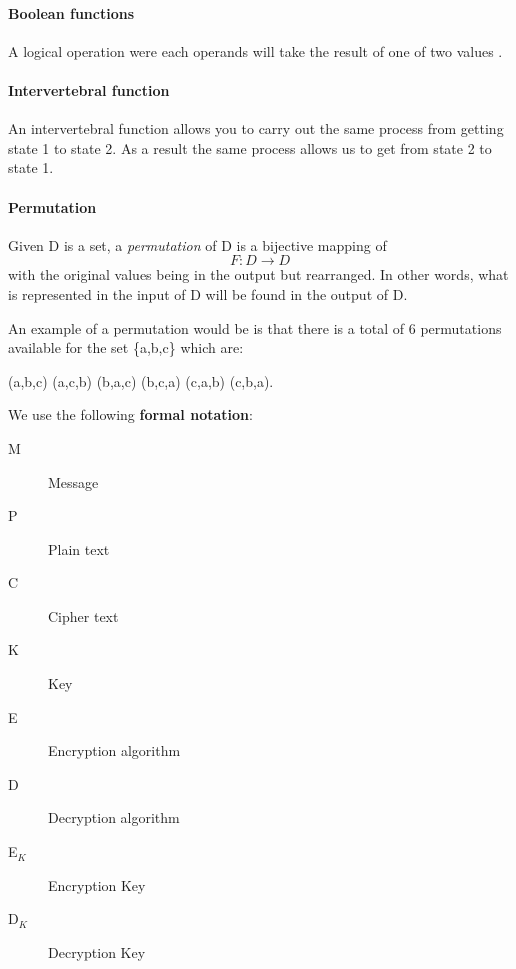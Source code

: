 \documentclass[11pt,a4paper]{report}
\begin{document}
\paragraph{Boolean functions}
A logical operation were each operands will take the result of one of two values \cite{Gregory2013Cryptanalysis}.

\paragraph{Intervertebral function}
An intervertebral function allows you to carry out the
same process from getting state 1 to state 2. As a result the same process
allows us to get from state 2 to state 1.

\paragraph{Permutation}
Given D is a set, a \emph{permutation} of D is a bijective mapping of
\begin{displaymath}
F: D \rightarrow D
\end{displaymath}
with the original values being in the output but rearranged. In other words, what is represented in the input of D will be found in the output of D.

An example of a permutation would be is that there is a total of 6 permutations available for the set \{a,b,c\} which are:
\begin{center}
(a,b,c) (a,c,b) (b,a,c) (b,c,a) (c,a,b) (c,b,a).
\end{center}


We use the following \textbf{formal notation}:
\begin{description}
\item[M] Message
\item[P] Plain text
\item[C] Cipher text
\item[K] Key
\item[E] Encryption algorithm
\item[D] Decryption algorithm
\item[E$_{K}$] Encryption Key
\item[D$_{K}$] Decryption Key
\end{description}
\end{document}
